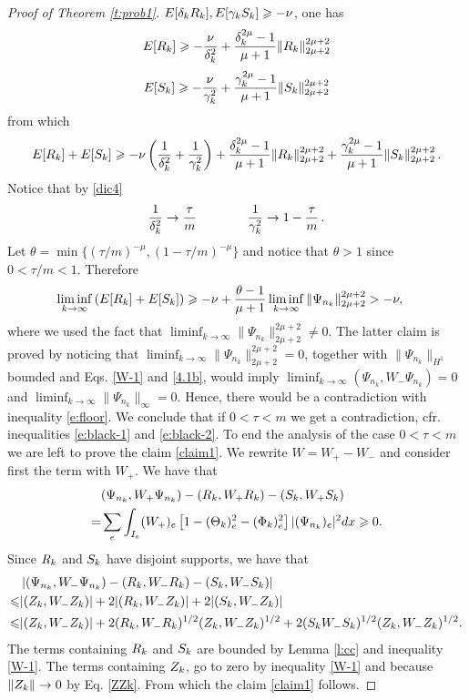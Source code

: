 {\begin{proof}[Proof of Theorem \ref{t:prob1}]
$E[\delta_k R_k], E[\gamma_k S_k] \geqslant -\nu$,  one has
\[
E[R_k] \geqslant - \frac{\nu}{\delta^2_k} + \frac{\delta^{2\mu}_k -1}{\mu+1} \| R_k
\|_{2\mu+2}^{2\mu+2}
\]
\[
E[S_k] \geqslant - \frac{\nu}{\gamma^2_k} + \frac{\gamma^{2\mu}_k -1}{\mu+1} \| S_k
\|_{2\mu+2}^{2\mu+2}
\]
from which 
\[
E[R_k]+E[S_k] \geqslant -\nu \left( \frac{1}{\delta^2_k} + \frac{1}{\gamma^2_k} \right) +
\frac{\delta^{2\mu}_k -1}{\mu+1} \| R_k \|_{2\mu+2}^{2\mu+2} +
\frac{\gamma^{2\mu}_k -1}{\mu+1} \| S_k \|_{2\mu+2}^{2\mu+2}\,.
\]
Notice that  by \eqref{dic4}
\[
\frac{1}{\delta^2_k} \to \frac{\tau}{m} \qquad \qquad \frac{1}{\gamma^2_k} \to 1-\frac{\tau}{m}\,.
\]
Let $\theta = \min \{ (\tau/m)^{-\mu} , (1-\tau/m)^{-\mu} \}$ and notice that $\theta
>1$ since $0<\tau/m <1$. Therefore
\begin{align}
\label{e:black-2}
\liminf_{k\to\infty} \left(
 E[ R_k] + E[S_k]
\right) 
&\geqslant -\nu + \frac{\theta -1}{\mu+1} \liminf_{k\to\infty} \| \Psi_{n_k}
\|_{2\mu+2}^{2\mu+2} > -\nu,
\end{align}
where we used the fact that $\liminf_{k\to\infty} \| \Psi_{n_k}
\|_{2\mu+2}^{2\mu+2} \neq 0$. The latter claim is proved by noticing
that $\liminf_{k\to\infty} \| \Psi_{n_k} 
\|_{2\mu+2}^{2\mu+2} = 0$,  together with $\| \Psi_{n_k}
\|_{H^1}$ bounded and Eqs. \eqref{W-1} and \eqref{4.1b},  would imply $\liminf_{k\to\infty} (\Psi_{n_k},W_-\Psi_{n_k}) =0$
 and $\liminf_{k\to\infty} \|\Psi_{n_k}\|_\infty =0$. Hence, there would be a contradiction with   inequality \eqref{e:floor}. We conclude that if $0<\tau<m$  we get a contradiction, cfr. inequalities \eqref{e:black-1} and \eqref{e:black-2}. To end the analysis of the case $0<\tau<m$ we are left to prove the claim \eqref{claim1}.  We rewrite $W = W_+- W_-$ and consider first the term with $W_+$. We have that 
\[\begin{aligned}
 &(\Psi_{n_k}, W_+\Psi_{n_k}) - (R_k,W_+ R_k) - (S_k, W_+S_k)     \\ 
=&   \sum_e \int_{I_e}(W_+)_e \left[1 - (\Theta_k)_e^2 - (\Phi_k)_e^2\right] |(\Psi_{n_k})_e|^2 dx \geqslant 0. 
\end{aligned}\]
Since $R_k$ and $S_k$ have disjoint supports, we have that 
\begin{equation*}\begin{aligned}
&\left| (\Psi_{n_k}, W_-\Psi_{n_k}) - (R_k,W_- R_k) - (S_k, W_-S_k) \right|  \\ 
\leqslant &  |(Z_k, W_-Z_k)| +2|(R_k,W_- Z_k)| +2 |(S_k, W_-Z_k) | \\  
\leqslant & | (Z_k, W_-Z_k)| +2(R_k,W_-R_k)^{1/2 }(Z_k,W_- Z_k)^{1/2} +2(S_kW_-S_k)^{1/2 }(Z_k,W_- Z_k)^{1/2} .
\end{aligned}\end{equation*}
The terms containing $R_k$ and $S_k$ are bounded by Lemma \ref{l:cc} and inequality \eqref{W-1}. The terms containing $Z_k$, go to zero by  inequality \eqref{W-1}  and because $\|Z_k\|\to 0$ by Eq. \eqref{ZZk}. From which the claim \eqref{claim1} follows. 


\end{proof}}
